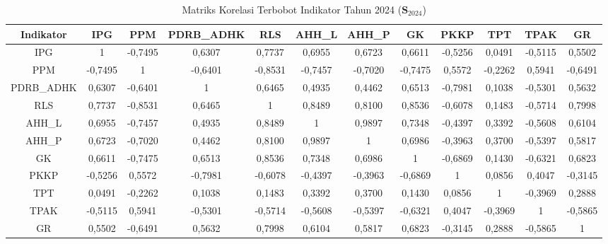 \begin{table}[H]
\centering
\caption{Matriks Korelasi Terbobot Indikator Tahun 2024 ($\mathbf{S}_{2024}$)} \label{tab:app1matriks_intra_loading_2024}
\begin{adjustbox}{max width=\textwidth, max height=0.85\textheight}
\begin{tabular}{|c|c|c|c|c|c|c|c|c|c|c|c|}
\hline
\textbf{Indikator} & \textbf{IPG} & \textbf{PPM} & \textbf{PDRB\_ADHK} & \textbf{RLS} & \textbf{AHH\_L} & \textbf{AHH\_P} & \textbf{GK} & \textbf{PKKP} & \textbf{TPT} & \textbf{TPAK} & \textbf{GR} \\
\hline
IPG & 1 & -0,7495 & 0,6307 & 0,7737 & 0,6955 & 0,6723 & 0,6611 & -0,5256 & 0,0491 & -0,5115 & 0,5502 \\
PPM & -0,7495 & 1 & -0,6401 & -0,8531 & -0,7457 & -0,7020 & -0,7475 & 0,5572 & -0,2262 & 0,5941 & -0,6491 \\
PDRB\_ADHK & 0,6307 & -0,6401 & 1 & 0,6465 & 0,4935 & 0,4462 & 0,6513 & -0,7981 & 0,1038 & -0,5301 & 0,5632 \\
RLS & 0,7737 & -0,8531 & 0,6465 & 1 & 0,8489 & 0,8100 & 0,8536 & -0,6078 & 0,1483 & -0,5714 & 0,7998 \\
AHH\_L & 0,6955 & -0,7457 & 0,4935 & 0,8489 & 1 & 0,9897 & 0,7348 & -0,4397 & 0,3392 & -0,5608 & 0,6104 \\
AHH\_P & 0,6723 & -0,7020 & 0,4462 & 0,8100 & 0,9897 & 1 & 0,6986 & -0,3963 & 0,3700 & -0,5397 & 0,5817 \\
GK & 0,6611 & -0,7475 & 0,6513 & 0,8536 & 0,7348 & 0,6986 & 1 & -0,6869 & 0,1430 & -0,6321 & 0,6823 \\
PKKP & -0,5256 & 0,5572 & -0,7981 & -0,6078 & -0,4397 & -0,3963 & -0,6869 & 1 & 0,0856 & 0,4047 & -0,3145 \\
TPT & 0,0491 & -0,2262 & 0,1038 & 0,1483 & 0,3392 & 0,3700 & 0,1430 & 0,0856 & 1 & -0,3969 & 0,2888 \\
TPAK & -0,5115 & 0,5941 & -0,5301 & -0,5714 & -0,5608 & -0,5397 & -0,6321 & 0,4047 & -0,3969 & 1 & -0,5865 \\
GR & 0,5502 & -0,6491 & 0,5632 & 0,7998 & 0,6104 & 0,5817 & 0,6823 & -0,3145 & 0,2888 & -0,5865 & 1 \\
\hline
\end{tabular}
\end{adjustbox}
\end{table}